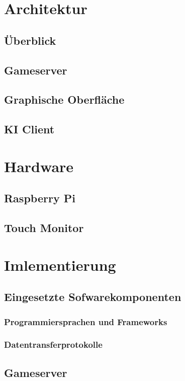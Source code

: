 \documentclass[12pt,a4paper,bibliography=totocnumbered,listof=totocnumbered]{article}
\begin{document}
\pagebreak

\section{Architektur}
\subsection{Überblick}
\subsection{Gameserver}
\subsection{Graphische Oberfläche}
\subsection{KI Client}

\section{Hardware}
\subsection{Raspberry Pi}
\subsection{Touch Monitor}

\section{Imlementierung}
\subsection{Eingesetzte Sofwarekomponenten}
\subsubsection{Programmiersprachen und Frameworks}
\subsubsection{Datentransferprotokolle}
\subsection{Gameserver}
\end{document}
